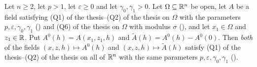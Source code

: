\begin{lemma}
Let $n\ge2$, let $p>1$, let $\varepsilon\ge0$ and let $\gamma_0,\gamma_1>0$.
Let $\Omega\subseteq\mathbb{R}^n$ be open, let $A$ be a field satisfying
(Q1) of the thesis--(Q2) of the thesis on $\Omega$ with the parameters
$p,\varepsilon,\gamma_0,\gamma_1$ () and
(Q6) of the thesis on $\Omega$ with modulus $\sigma$
(), and let $x_1\in\Omega$ and $z_1\in\mathbb{R}$.  Put
$A^0(h)=A(x_1,z_1,h)$ and
$\widetilde A(h)=A^0(h)-A^0(0)$.  Then \emph{both} of the fields
$(x,z,h)\mapsto A^0(h)$ and $(x,z,h)\mapsto\widetilde A(h)$ satisfy
(Q1) of the thesis--(Q2) of the thesis on all of $\mathbb{R}^n$ with the same parameters
$p,\varepsilon,\gamma_0,\gamma_1$ ().
\end{lemma}
